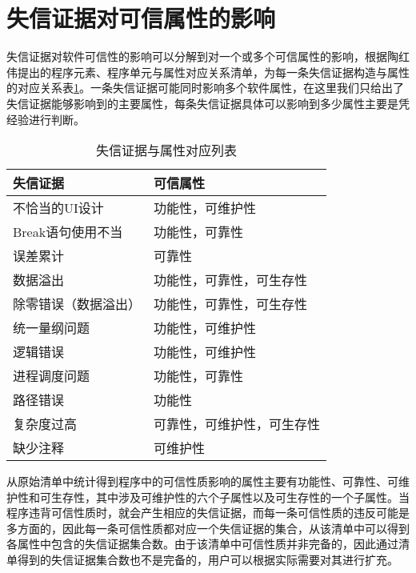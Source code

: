 \section{失信证据对可信属性的影响}
失信证据对软件可信性的影响可以分解到对一个或多个可信属性的影响，根据陶红伟\cite{陶红伟2011}提出的程序元素、程序单元与属性对应关系清单，为每一条失信证据构造与属性的对应关系表\ref{tab:evidenceMatchAttr}。一条失信证据可能同时影响多个软件属性，在这里我们只给出了失信证据能够影响到的主要属性，每条失信证据具体可以影响到多少属性主要是凭经验进行判断。
\begin{table}[H]
 \centering
  \caption{失信证据与属性对应列表}
 \begin{tabular}{|l|l|}%
\hline
\textbf{失信证据} & \textbf{可信属性} \\
\hline
不恰当的UI设计 & 功能性，可维护性\\
\hline
Break语句使用不当 & 功能性，可靠性\\
\hline
误差累计 & 可靠性\\
\hline
数据溢出 & 功能性，可靠性，可生存性\\
\hline
除零错误（数据溢出）& 功能性，可靠性，可生存性\\
\hline
统一量纲问题 & 功能性，可维护性\\
\hline
逻辑错误 & 功能性，可维护性\\
\hline
进程调度问题 & 功能性，可靠性\\
\hline
路径错误 & 功能性\\
\hline
复杂度过高 & 可靠性，可维护性，可生存性\\
\hline
缺少注释 & 可维护性\\
\hline
 \end{tabular}
 \label{tab:evidenceMatchAttr}
\end{table}

从原始清单中统计得到程序中的可信性质影响的属性主要有功能性、可靠性、可维护性和可生存性，其中涉及可维护性的六个子属性以及可生存性的一个子属性。当程序违背可信性质时，就会产生相应的失信证据，而每一条可信性质的违反可能是多方面的，因此每一条可信性质都对应一个失信证据的集合，从该清单中可以得到各属性中包含的失信证据集合数。由于该清单中可信性质并非完备的，因此通过清单得到的失信证据集合数也不是完备的，用户可以根据实际需要对其进行扩充。

